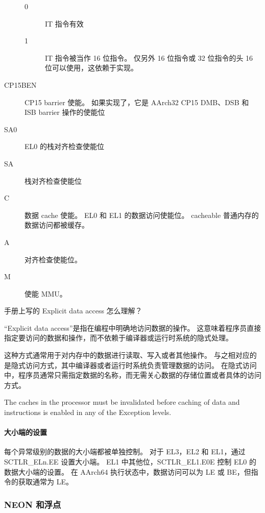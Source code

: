 \begin{description}
\begin{description}
      \item[0] IT 指令有效
      \item[1] IT 指令被当作 16 位指令。
        仅另外 16 位指令或 32 位指令的头 16 位可以使用，这依赖于实现。
    \end{description}
  \item[CP15BEN] CP15 barrier 使能。
    如果实现了，它是 AArch32 CP15 DMB、DSB 和 ISB barrier 操作的使能位
  \item[SA0] EL0 的栈对齐检查使能位
  \item[SA] 栈对齐检查使能位
  \item[C] 数据 cache 使能。
    EL0 和 EL1 的数据访问使能位。
    cacheable 普通内存的数据访问都被缓存。
  \item[A] 对齐检查使能位。
  \item[M] 使能 MMU。
\end{description}

\begin{probsolu}[title={Problem and Solution \theprob}]{
    手册上写的 Explicit data access 怎么理解？}

  “Explicit data access”是指在编程中明确地访问数据的操作。
  这意味着程序员直接指定要访问的数据和操作，而不依赖于编译器或运行时系统的隐式处理。

  这种方式通常用于对内存中的数据进行读取、写入或者其他操作。
  与之相对应的是隐式访问方式，其中编译器或者运行时系统负责管理数据的访问。
  在隐式访问中，程序员通常只需指定数据的名称，而无需关心数据的存储位置或者具体的访问方式。

\end{probsolu}

\begin{remark}
  The caches in the processor must be invalidated before caching of data and instructions is
enabled in any of the Exception levels.
\end{remark}

\paragraph*{大小端的设置}

每个异常级别的数据的大小端都被单独控制。
对于 EL3，EL2 和 EL1，通过 SCTLR\_ELn.EE 设置大小端。
EL1 中其他位，SCTLR\_EL1.E0E 控制 EL0 的数据大小端的设置。
在 AArch64 执行状态中，数据访问可以为 LE 或 BE，但指令的获取通常为 LE。

\subsubsection{NEON 和浮点}

